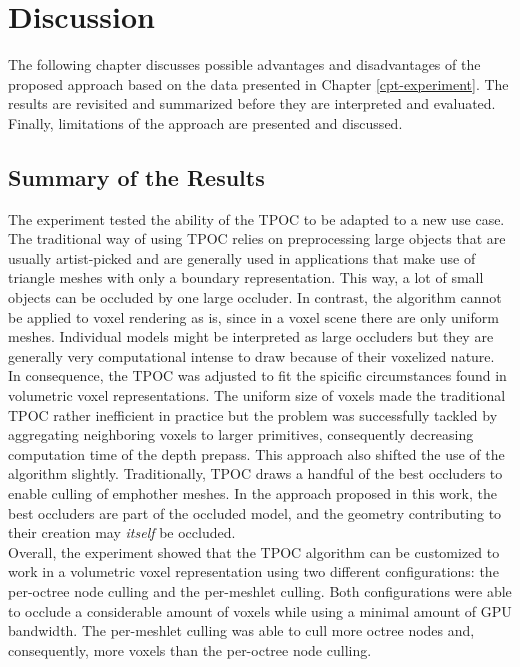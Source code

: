 \chapter{Discussion} \label{cpt-discussion}

The following chapter discusses possible advantages and disadvantages of the proposed approach based on 
the data presented in Chapter \ref{cpt-experiment}. The results are revisited and summarized before they 
are interpreted and evaluated. Finally, limitations of the approach are presented and discussed.

\section{Summary of the Results}

The experiment tested the ability of the \ac{TPOC} to be adapted to a new use case. The traditional way of 
using \ac{TPOC} relies on preprocessing large objects that are usually artist-picked and are generally used 
in applications that make use of triangle meshes with only a boundary representation. This way, a lot of 
small objects can be occluded by one large occluder. In contrast, the algorithm cannot be applied to voxel 
rendering as is, since in a voxel scene there are only uniform meshes. Individual models might be interpreted 
as large occluders but they are generally very computational intense to draw because of their voxelized nature. \\

\noindent
In consequence, the \ac{TPOC} was adjusted to fit the spicific circumstances found in volumetric voxel representations. 
The uniform size of voxels made the traditional \ac{TPOC} rather inefficient in practice but the problem was 
successfully tackled by aggregating neighboring voxels to larger primitives, consequently decreasing computation 
time of the depth prepass. This approach also shifted the use of the algorithm slightly. Traditionally, \ac{TPOC} 
draws a handful of the best occluders to enable culling of emph{other} meshes. In the approach proposed in this work, 
the best occluders are part of the occluded model, and the geometry contributing to their creation may 
\emph{itself} be occluded. \\

\noindent
Overall, the experiment showed that the \ac{TPOC} algorithm can be customized to work in a volumetric voxel 
representation using two different configurations: the per-octree node culling and the per-meshlet culling. 
Both configurations were able to occlude a considerable amount of voxels while using a minimal amount of 
\ac{GPU} bandwidth. The per-meshlet culling was able to cull more octree nodes and, consequently, more 
voxels than the per-octree node culling. \\

